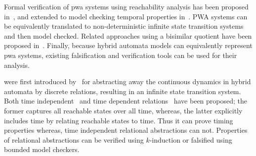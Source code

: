  Formal verification of pwa
systems using reachability analysis has been proposed
in~\cite{yordanov2010formal, koutsoukos2003safety,
asarin2000approximate}, and extended to model checking temporal
properties in~\cite{yordanov2007model, batt2007model}. PWA systems can
be equivalently translated to non-deterministic infinite state
transition systems and then model checked.  Related approaches using a
bisimilar quotient have been proposed in~\cite{pappas2003bisimilar,
tabuada2006linear, yordanov2007model}. Finally, because hybrid
automata models can equivalently represent pwa systems, existing
falsification and verification tools can be used for their analysis.

 were first introduced
by~\cite{Sankaranarayanan+Tiwari/2011/Relational} for abstracting away the
continuous dynamics in hybrid automata by discrete relations, %
resulting in an infinite state transition system.  Both time
independent~\cite{Sankaranarayanan+Tiwari/2011/Relational} and time
dependent relations~\cite{zutshi2012timed, mover2013time} have been
proposed; the former captures all reachable states over all time,
whereas, the latter explicitly includes time by relating reachable
states to time. Thus it can prove timing properties whereas, time
independent relational abstractions can not. Properties of relational
abstractions can be verified using $k$-induction or falsified
using bounded model checkers.










